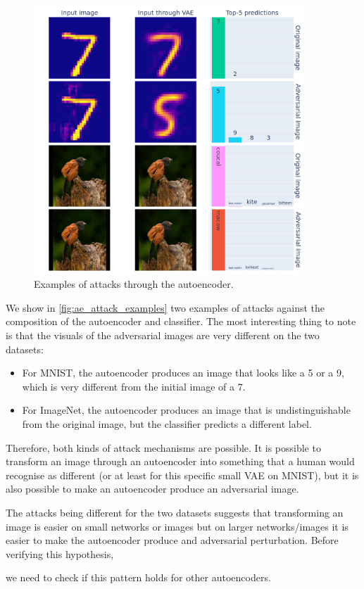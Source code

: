 \documentclass[]{scrarticle}
\renewcommand{\todo}[1]{}
\begin{document}
\begin{figure}[h]
  \centering
  \includegraphics[width=0.9\textwidth]{../images/ae_attack_examples.png}
  \caption{
    Examples of attacks through the autoencoder.
  }
  \label{fig:ae_attack_examples}
\end{figure}


We show in \autoref{fig:ae_attack_examples} two examples of attacks
against the composition of the autoencoder and classifier.
The most interesting thing to note is that the visuals of the
adversarial images are very different on the two datasets:
\begin{itemize}
  \item For MNIST, the autoencoder produces an image that looks like
    a 5 or a 9, which is very different from the initial image of a 7.
  \item For ImageNet, the autoencoder produces an image that is undistinguishable
    from the original image, but the classifier predicts a different label.
\end{itemize}

Therefore, both kinds of attack mechanisms are possible. It is possible to transform an image through an autoencoder
into something that a human would recognise as different
(or at least for this specific small VAE on MNIST), but it is also possible
to make an autoencoder produce an adversarial image.

The attacks being different for the two datasets suggests that
transforming an image is easier on small networks or images
but on larger networks/images it is easier to make the autoencoder
produce and adversarial perturbation.
Before verifying this hypothesis,
\todo{verify this hypothesis}
we need to check if this pattern holds for other autoencoders.
\end{document}
